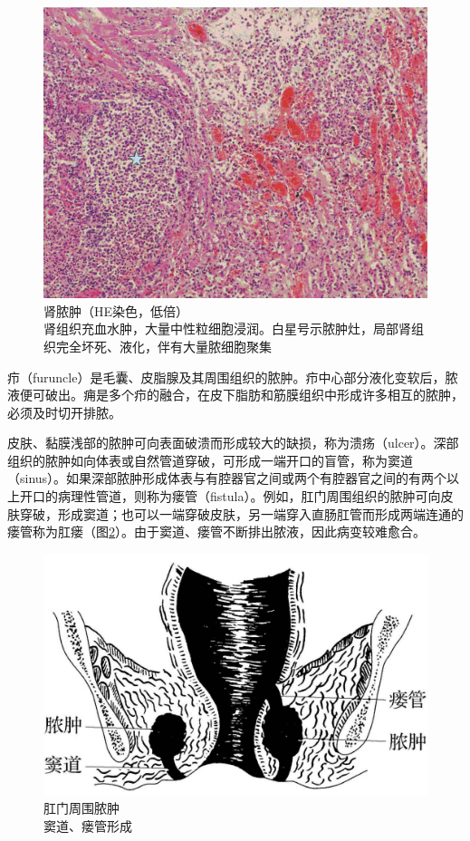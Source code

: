 \begin{figure}[!htbp]
 \centering
 \includegraphics{./images/Image00060.jpg}
 \captionsetup{justification=centering}
 \caption{肾脓肿（HE染色，低倍）\\ {\small 肾组织充血水肿，大量中性粒细胞浸润。白星号示脓肿灶，局部肾组织完全坏死、液化，伴有大量脓细胞聚集}}
 \label{fig4-9}
  \end{figure} 



疖（furuncle）是毛囊、皮脂腺及其周围组织的脓肿。疖中心部分液化变软后，脓液便可破出。痈是多个疖的融合，在皮下脂肪和筋膜组织中形成许多相互的脓肿，必须及时切开排脓。

皮肤、黏膜浅部的脓肿可向表面破溃而形成较大的缺损，称为溃疡（ulcer）。深部组织的脓肿如向体表或自然管道穿破，可形成一端开口的盲管，称为窦道（sinus）。如果深部脓肿形成体表与有腔器官之间或两个有腔器官之间的有两个以上开口的病理性管道，则称为瘘管（fistula）。例如，肛门周围组织的脓肿可向皮肤穿破，形成窦道；也可以一端穿破皮肤，另一端穿入直肠肛管而形成两端连通的瘘管称为肛瘘（图\ref{fig4-10}）。由于窦道、瘘管不断排出脓液，因此病变较难愈合。

\begin{figure}[!htbp]
 \centering
 \includegraphics{./images/Image00061.jpg}
 \caption{肛门周围脓肿 \\ {\small 窦道、瘘管形成}}
 \label{fig4-10}
  \end{figure} 


